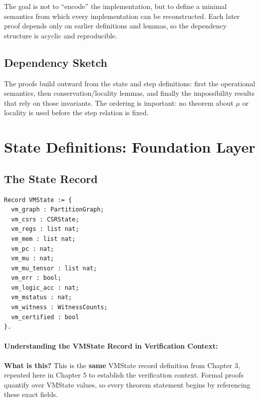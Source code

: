 The goal is not to “encode” the implementation, but to define a minimal semantics from which every implementation can be reconstructed. Each later proof depends only on earlier definitions and lemmas, so the dependency structure is acyclic and reproducible.

\subsection{Dependency Sketch}

The proofs build outward from the state and step definitions: first the operational semantics, then conservation/locality lemmas, and finally the impossibility results that rely on those invariants. The ordering is important: no theorem about $\mu$ or locality is used before the step relation is fixed.

\section{State Definitions: Foundation Layer}

\subsection{The State Record}

\begin{lstlisting}
Record VMState := {
  vm_graph : PartitionGraph;
  vm_csrs : CSRState;
  vm_regs : list nat;
  vm_mem : list nat;
  vm_pc : nat;
  vm_mu : nat;
  vm_mu_tensor : list nat;
  vm_err : bool;
  vm_logic_acc : nat;
  vm_mstatus : nat;
  vm_witness : WitnessCounts;
  vm_certified : bool
}.
\end{lstlisting}

\paragraph{Understanding the VMState Record in Verification Context:}

\textbf{What is this?} This is the \textbf{same} VMState record definition from Chapter 3, repeated here in Chapter 5 to establish the verification context. Formal proofs quantify over VMState values, so every theorem statement begins by referencing these exact fields.

